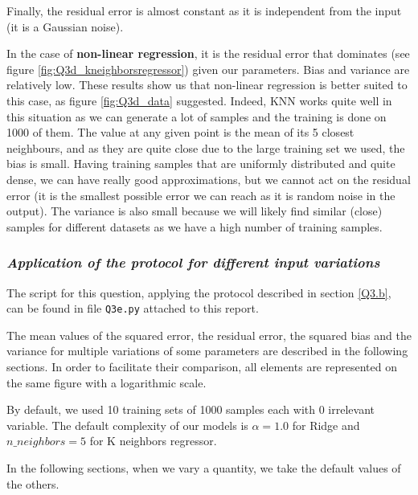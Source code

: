 Finally, the residual error is almost constant as it is independent from the input (it is a Gaussian noise).\par
In the case of {\bf non-linear regression}, it is the residual error that dominates (see figure \ref{fig:Q3d_kneighborsregressor}) given our parameters. Bias and variance are relatively low. These results show us that non-linear regression is better suited to this case, as figure \ref{fig:Q3d_data} suggested. Indeed, KNN works quite well in this situation as we can generate a lot of samples and the training is done on 1000 of them. The value at any given point is the mean of its 5 closest neighbours, and as they are quite close due to the large training set we used, the bias is small. Having training samples that are uniformly distributed and quite dense, we can have really good approximations, but we cannot act on the residual error (it is the smallest possible error we can reach as it is random noise in the output). The variance is also small because we will likely find similar (close) samples for different datasets as we have a high number of training samples. 

\subsubsection{{\it Application of the protocol for different input variations}}
The script for this question, applying the protocol described in section \ref{Q3.b}, can be found in file \texttt{Q3e.py} attached to this report.\par
The mean values of the squared error, the residual error, the squared bias and the variance for multiple variations of some parameters are described in the following sections. In order to facilitate their comparison, all elements are represented on the same figure with a logarithmic scale.\par
By default, we used 10 training sets of 1000 samples each with 0 irrelevant variable. The default complexity of our models is $\alpha = 1.0$ for Ridge and $n\_neighbors = 5$ for K neighbors regressor.\par
In the following sections, when we vary a quantity, we take the default values of the others.

